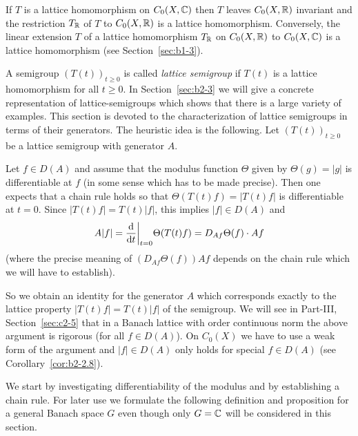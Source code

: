 \begin{remark}\label{rem:b2-2.1}
If\/ $T$ is a lattice homomorphism on $C_{0}(X,\mathbb{C})$ then $T$ leaves $C_{0}(X,\mathbb{R})$ invariant and the restriction $T_{\mathbb{R}}$ of\/ $T$ to $C_{0}(X,\mathbb{R})$ is a lattice homomorphism.
Conversely, the linear extension $T$ of a lattice homomorphism $T_{\mathbb{R}}$ on $C_{0}(X,\mathbb{R})$ to $C_{0}(X,\mathbb{C})$ is a lattice homomorphism (see Section~\ref{sec:b1-3}).
\end{remark}

A semigroup $(T(t))_{t \geq 0}$ is called \emph{lattice semigroup} if\/ $T(t)$ is a lattice homomorphism for all $t \geq 0$.
In Section~\ref{sec:b2-3} we will give a concrete representation of lattice-semigroups which shows that there is a large variety of examples.
This section is devoted to the characterization of lattice semigroups in terms of their generators.
The heuristic idea is the following.
Let $(T(t))_{t \geq 0}$ be a lattice semigroup with generator $A$.

Let $f \in D(A)$ and assume that the modulus function $\Theta$ given by $\Theta(g) = |g|$ is differentiable at $f$ (in some sense which has to be made precise).
Then one expects that a chain rule holds so that $\Theta(T(t)f) = |T(t)f|$ is differentiable at $t = 0$.
Since $|T(t)f| = T(t)|f|$, this implies $|f| \in D(A)$ and 
\[
A|f| = \frac{\mathop{}\!\mathrm{d}{}}{\mathop{}\!\mathrm{d}{t}}\bigg|_{t=0} \Theta(T(t)f)
     = D_{Af}\Theta(f) \cdot Af
\]
 (where the precise meaning of\/ $(D_{Af}\Theta(f))Af$  
 depends on the chain rule which we will have to establish).
 
So we obtain an identity for the generator $A$ which corresponds exactly to the lattice property $|T(t)f| = T(t)|f|$ of the semigroup.
We will see in Part-III, Section~\ref{sec:c2-5} that in a Banach lattice with order continuous norm the above argument is rigorous (for all $f \in D(A)$).
On $C_{0}(X)$ we have to use a weak form of the argument and $|f| \in D(A)$ only holds for special $f \in D(A)$ (see Corollary~\ref{cor:b2-2.8}).

We start by investigating differentiability of the modulus and by establishing a chain rule.
For later use we formulate the following definition and proposition for a general Banach space $G$ even though only $G = \mathbb{C}$ will be considered in this section.

